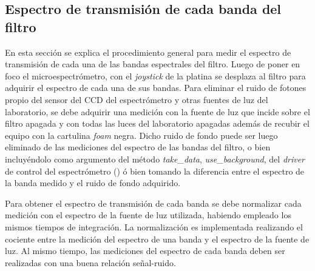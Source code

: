 
\singlespacing
\subsection{Espectro de transmisión de cada banda del filtro \href{https://github.com/jrr1984/open_frame_XYStage/blob/master/plot_spectrum_bands/plot_spectrum_bands.py}{\faGithub}}
\label{sec:espectransm}

\hspace{0.5cm}En esta sección se explica el procedimiento general para medir el espectro de transmisión de cada una de las bandas espectrales del filtro. Luego de poner en foco el microespectrómetro, con el \textit{joystick} de la platina se desplaza al filtro para adquirir el espectro de cada una de sus bandas. Para eliminar el ruido de fotones propio del sensor del CCD del espectrómetro y otras fuentes de luz del laboratorio, se debe adquirir una medición con la fuente de luz que incide sobre el filtro apagada y con todas las luces del laboratorio apagadas además de recubir el equipo con la cartulina \textit{foam} negra. Dicho ruido de fondo puede ser luego eliminado de las mediciones del espectro de las bandas del filtro, o bien incluyéndolo como argumento del método \textit{take\_data}, \textit{use\_background}, del \textit{driver} de control del espectrómetro (\href{https://github.com/jrr1984/open\_frame\_XYStage/blob/master/XYStageAndSpec.py}{\faGithub}) ó bien tomando la diferencia entre el espectro de la banda medido y el ruido de fondo adquirido.

Para obtener el espectro de transmisión de cada banda se debe normalizar cada medición con el espectro de la fuente de luz utilizada, habiendo empleado los mismos tiempos de integración. La normalización es implementada realizando el cociente entre la medición del espectro de una banda y el espectro de la fuente de luz. Al mismo tiempo, las mediciones del espectro de cada banda deben ser realizadas con una buena relación señal-ruido.

